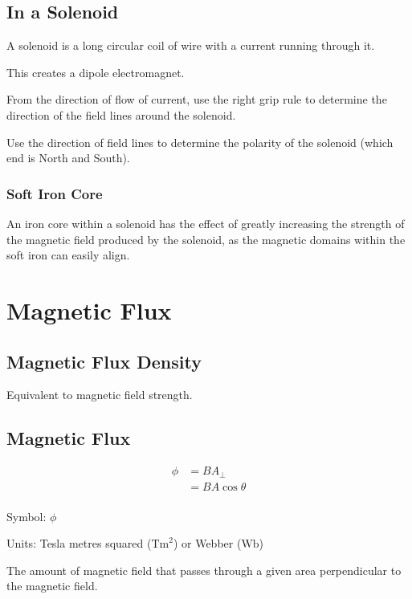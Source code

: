 \documentclass[a4paper,11pt]{article}
\begin{document}
\subsection{In a Solenoid}

A solenoid is a long circular coil of wire with a current running through it.

This creates a dipole electromagnet.

From the direction of flow of current, use the right grip rule to determine the
direction of the field lines around the solenoid.

Use the direction of field lines to determine the polarity of the solenoid
(which end is North and South).


\subsubsection{Soft Iron Core}

An iron core within a solenoid has the effect of greatly increasing the
strength of the magnetic field produced by the solenoid, as the magnetic
domains within the soft iron can easily align.




\section{Magnetic Flux}

\subsection{Magnetic Flux Density}

Equivalent to magnetic field strength.


\subsection{Magnetic Flux}

$$
\begin{aligned}
\phi & = BA_{\bot} \\
& = BA \cos{\theta} \\
\end{aligned}
$$

Symbol: $\phi$

Units: Tesla metres squared ($\text{Tm}^2$) or Webber ($\text{Wb}$)

The amount of magnetic field that passes through a given area perpendicular to
the magnetic field.
\end{document}
